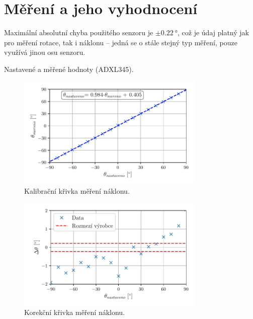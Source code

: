 \documentclass{protokol}
\begin{document}
    \maketitle

    \section{Měření a jeho vyhodnocení }
        Maximální absolutní chyba použitého senzoru je \(\pm \qty{0.22}{\degree}\), což je údaj platný jak pro měření rotace, tak i náklonu -- jedná se o stále stejný typ měření, pouze využívá jinou osu senzoru. 

        \begin{table}[ht!]
            \caption{Nastavené a měřené hodnoty (ADXL345).}
            \def\arraystretch{1.2}
            \centering
            
        \end{table}

    \begin{figure}[h!]
        \centering
        \includegraphics[width=0.8\textwidth]{img/naklon-kalib.pdf}
        \caption{Kalibrační křivka měření náklonu.}
        \label{fig:img/graf-1}
    \end{figure}
    
    \begin{figure}[h!]
        \centering
        \includegraphics[width=0.8\textwidth]{img/naklon-korek.pdf}
        \caption{Korekční křivka měření náklonu.}
        \label{fig:img/graf-1}
    \end{figure}
\end{document}
